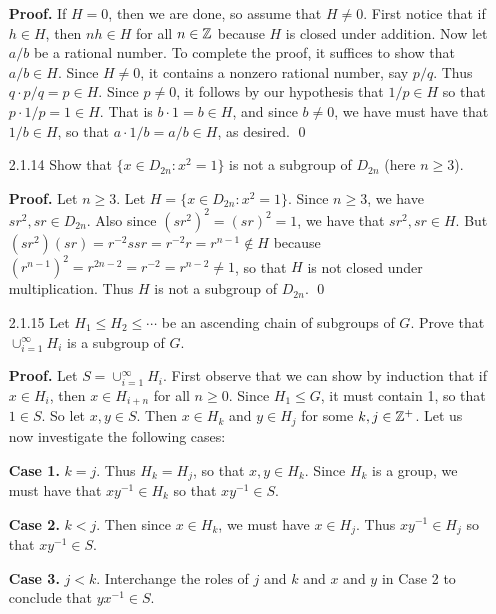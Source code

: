 \begin{enumerate}
      \textbf{Proof.} If $H = 0$, then we are done, so assume that $H \neq 0$.
      First notice that if $h \in H$, then $nh \in H$ for all $n \in \mathbb{Z}$ because
      $H$ is closed under addition. Now let $a/b$ be a rational number. To 
      complete the proof, it suffices to show that $a/b \in H$. Since
      $H \neq 0$, it contains a nonzero rational number, say $p/q$.
      Thus $q \cdot p/q = p \in H$. Since $p \neq 0$, it follows by our 
      hypothesis that $1/p \in H$ so that $p \cdot 1/p = 1 \in H$. That is
      $b \cdot 1 = b \in H$, and since $b \neq 0$, we have must have that
      $1/b \in H$, so that $a \cdot 1/b = a/b \in H$, as desired. \qed
   \item[2.1.14]  Show that $\{x \in D_{2n} : x^2 = 1\}$ is not a subgroup of
                  $D_{2n}$ (here $n \ge 3$).

      \textbf{Proof.} Let $n \ge 3$. Let $H = \{x \in D_{2n} : x^2 = 1\}$. Since
      $n \ge 3$, we have $sr^2, sr \in D_{2n}$. Also since
      $(sr^2)^2 = (sr)^2 = 1$, we have that $sr^2, sr \in H$. But
      $(sr^2)(sr) = r^{-2}ssr = r^{-2}r = r^{n-1} \notin H$ because
      $(r^{n-1})^2 = r^{2n-2} = r^{-2} = r^{n-2} \neq 1$, so that $H$ is not 
      closed under multiplication. Thus $H$ is not a subgroup of $D_{2n}$. \qed
   \item[2.1.15]  Let $H_1 \le H_2 \le \cdots$ be an ascending chain of
                  subgroups of $G$. Prove that $\cup_{i=1}^\infty H_i$ is a 
                  subgroup of $G$.

      \textbf{Proof.} Let $S = \cup_{i=1}^\infty H_i$. First observe that we
      can show by induction that if $x \in H_i$, then $x \in H_{i+n}$ for all
      $n \ge 0$. Since $H_1 \le G$, it must contain 1, so that $1 \in S$. So
      let $x, y \in S$. Then $x \in H_k$ and $y \in H_j$ for some
      $k, j \in \mathbb{Z}^+$. Let us now investigate the following cases:

      \textbf{Case 1.} $k = j$. Thus $H_k = H_j$, so that $x, y \in H_k$. Since
      $H_k$ is a group, we must have that $xy^{-1} \in H_k$ so that
      $xy^{-1} \in S$.

      \textbf{Case 2.} $k < j$. Then since $x \in H_k$, we must have
      $x \in H_j$. Thus $xy^{-1} \in H_j$ so that $xy^{-1} \in S$.

      \textbf{Case 3.} $j < k$. Interchange the roles of $j$ and $k$ and $x$
      and $y$ in Case 2 to conclude that $yx^{-1} \in S$. \\


\end{enumerate}
